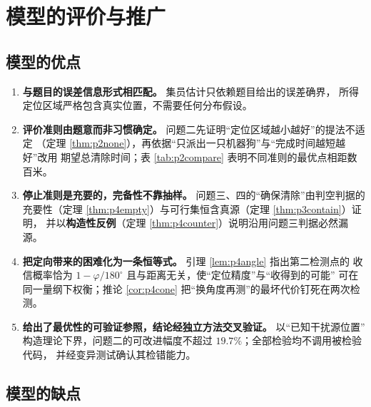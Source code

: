 \documentclass[withoutpreface, bwprint]{cumcmthesis}
\begin{document}
\section{模型的评价与推广}

\subsection{模型的优点}

\begin{enumerate}[label=(\arabic*), itemsep=1pt]
  \item \textbf{与题目的误差信息形式相匹配。} 集员估计只依赖题目给出的误差确界，
        所得定位区域严格包含真实位置，不需要任何分布假设。
  \item \textbf{评价准则由题意而非习惯确定。} 问题二先证明“定位区域越小越好”的提法不适定
        （定理 \ref{thm:p2none}），再依据“只派出一只机器狗”与“完成时间越短越好”改用
        期望总清除时间；表 \ref{tab:p2compare} 表明不同准则的最优点相距数百米。
  \item \textbf{停止准则是充要的，完备性不靠抽样。} 问题三、四的“确保清除”由判空判据的
        充要性（定理 \ref{thm:p4empty}）与可行集恒含真源（定理 \ref{thm:p3contain}）证明，
        并以\textbf{构造性反例}（定理 \ref{thm:p4counter}）说明沿用问题三判据必然漏源。
  \item \textbf{把定向带来的困难化为一条恒等式。} 引理 \ref{lem:p4angle} 指出第二检测点的
        收信概率恰为 $1-\varphi/180^\circ$ 且与距离无关，使“定位精度”与“收得到的可能”
        可在同一量纲下权衡；推论 \ref{cor:p4cone} 把“换角度再测”的最坏代价钉死在两次检测。
  \item \textbf{给出了最优性的可验证参照，结论经独立方法交叉验证。} 以“已知干扰源位置”
        构造理论下界，问题二的可改进幅度不超过 $19.7\%$；全部检验均不调用被检验代码，
        并经变异测试确认其检错能力。
\end{enumerate}

\subsection{模型的缺点}
\end{document}
